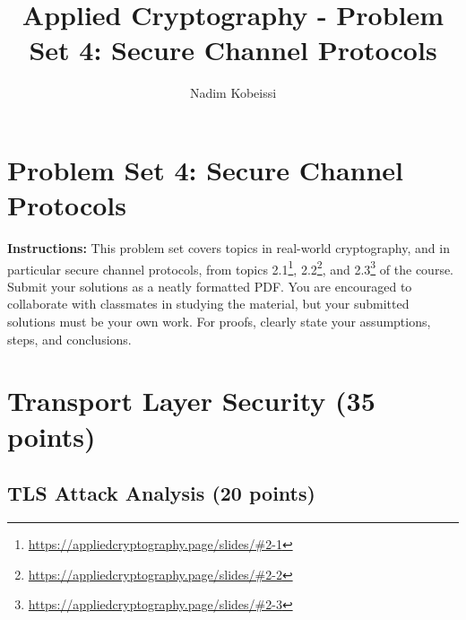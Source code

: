 \documentclass[10pt,a4paper,american]{article}
\title{Applied Cryptography - Problem Set 4: Secure Channel Protocols}
\author{Nadim Kobeissi}
\begin{document}
\classhandoutheader
\section*{Problem Set 4: Secure Channel Protocols}

\begin{tcolorbox}[colframe=OliveGreen!30!white,colback=OliveGreen!5!white]
	\textbf{Instructions:} This problem set covers topics in real-world cryptography, and in particular secure channel protocols, from topics 2.1\footnote{\url{https://appliedcryptography.page/slides/\#2-1}}, 2.2\footnote{\url{https://appliedcryptography.page/slides/\#2-2}}, and 2.3\footnote{\url{https://appliedcryptography.page/slides/\#2-3}} of the course. Submit your solutions as a neatly formatted PDF. You are encouraged to collaborate with classmates in studying the material, but your submitted solutions must be your own work. For proofs, clearly state your assumptions, steps, and conclusions.
\end{tcolorbox}

\section{Transport Layer Security (35 points)}

\subsection{TLS Attack Analysis (20 points)}
\end{document}
